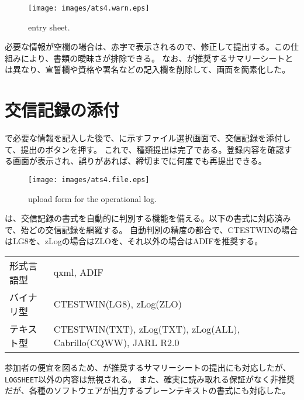 \documentclass[10pt,a4paper]{book}
\begin{document}
\begin{figure}[H]
\vspace{1ex}
\centering
\texttt{[image: images/ats4.warn.eps]}
\caption{entry sheet.\label{fig:entry}}
\end{figure}

必要な情報が空欄の場合は、赤字で表示されるので、修正して提出する。この仕組みにより、書類の曖昧さが排除できる。
なお、\jarl{}が推奨するサマリーシートとは異なり、宣誓欄や資格や署名などの記入欄を削除して、画面を簡素化した。

\section{交信記録の添付\label{sect:upload}}

で必要な情報を記入した後で、に示すファイル選択画面で、交信記録を添付して、提出のボタンを押す。
これで、種類提出は完了である。登録内容を確認する画面が表示され、誤りがあれば、締切までに何度でも再提出できる。

\begin{figure}[H]
\centering
\texttt{[image: images/ats4.file.eps]}
\caption{upload form for the operational log.\label{fig:upload}}
\end{figure}

は、交信記録の書式を自動的に判別する機能を備える。以下の書式に対応済みで、殆どの交信記録を網羅する。
自動判別の精度の都合で、CTESTWINの場合はLG8を、zLogの場合はZLOを、それ以外の場合はADIFを推奨する。

\begin{table}[H]
\raggedright
\begin{tabular}{BT}
形式言語型 & qxml, ADIF \\
バイナリ型 & CTESTWIN(LG8), zLog(ZLO) \\
テキスト型 & CTESTWIN(TXT), zLog(TXT), zLog(ALL), Cabrillo(CQWW), JARL R2.0 \\
\end{tabular}
\end{table}

参加者の便宜を図るため、\jarl{}が推奨するサマリーシートの提出にも対応したが、\texttt{LOGSHEET}以外の内容は無視される。
また、確実に読み取れる保証がなく非推奨だが、各種のソフトウェアが出力するプレーンテキストの書式にも対応した。
\end{document}
